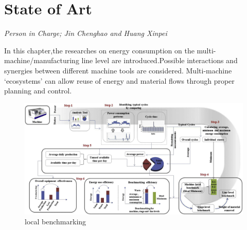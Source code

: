 \newpage
\section{State of Art}
\label{chapter3}

\textit{Person in Charge; Jin Chenghao and Huang Xinpei}


In this chapter,the researches on energy consumption on the multi-machine/manufacturing line level are introduced.Possible interactions and synergies between different machine tools are considered. Multi-machine ‘ecosystems’ can allow reuse of energy and material flows through proper planning and control.





\begin{figure}[h!]
	\centering
	\includegraphics[width=0.7\linewidth]{Figure/local-benchmarking.jpg}
	\caption{local benchmarking}
	\label{fig:local-benchmarking}
\end{figure}


